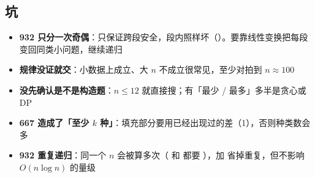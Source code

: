 \subsection{坑}
\begin{itemize}
\item \textbf{932 只分一次奇偶}：只保证跨段安全，段内照样坏（\code{[1,3,5]}）。要靠线性变换把每段变回同类小问题，继续递归
\item \textbf{规律没证就交}：小数据上成立、大 $n$ 不成立很常见，至少对拍到 $n \approx 100$
\item \textbf{没先确认是不是构造题}：$n \le 12$ 就直接搜；有「最少 / 最多」多半是贪心或 DP
\item \textbf{667 造成了「至少 $k$ 种」}：填充部分要用已经出现过的差（1），否则种类数会多
\item \textbf{932 重复递归}：同一个 $n$ 会被算多次（ 和  都要 ），加  省掉重复，但不影响 $O(n \log n)$ 的量级
\end{itemize}
